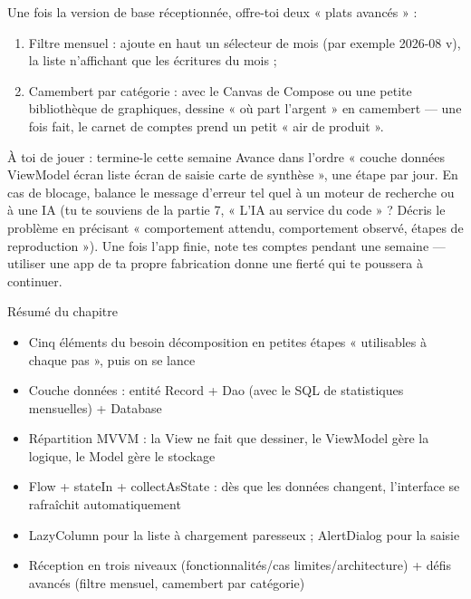 Une fois la version de base réceptionnée, offre-toi deux « plats avancés » :

\begin{enumerate}
  \item Filtre mensuel : ajoute en haut un sélecteur de mois (par exemple 2026-08 v), la liste n'affichant que les écritures du mois ;
  \item Camembert par catégorie : avec le Canvas de Compose ou une petite bibliothèque de graphiques, dessine « où part l'argent » en camembert — une fois fait, le carnet de comptes prend un petit « air de produit ».
\end{enumerate}

\begin{tcbpractice}{À toi de jouer : termine-le cette semaine}
Avance dans l'ordre « couche données ViewModel écran liste écran de saisie carte de synthèse », une étape par jour. En cas de blocage, balance le message d'erreur tel quel à un moteur de recherche ou à une IA (tu te souviens de la partie 7, « L'IA au service du code » ? Décris le problème en précisant « comportement attendu, comportement observé, étapes de reproduction »). Une fois l'app finie, note tes comptes pendant une semaine — utiliser une app de ta propre fabrication donne une fierté qui te poussera à continuer.

\end{tcbpractice}

\begin{tcbsummary}{Résumé du chapitre}
\begin{itemize}
  \item Cinq éléments du besoin décomposition en petites étapes « utilisables à chaque pas », puis on se lance
  \item Couche données : entité Record + Dao (avec le SQL de statistiques mensuelles) + Database
  \item Répartition MVVM : la View ne fait que dessiner, le ViewModel gère la logique, le Model gère le stockage
  \item Flow + stateIn + collectAsState : dès que les données changent, l'interface se rafraîchit automatiquement
  \item LazyColumn pour la liste à chargement paresseux ; AlertDialog pour la saisie
  \item Réception en trois niveaux (fonctionnalités/cas limites/architecture) + défis avancés (filtre mensuel, camembert par catégorie)
\end{itemize}

\end{tcbsummary}
